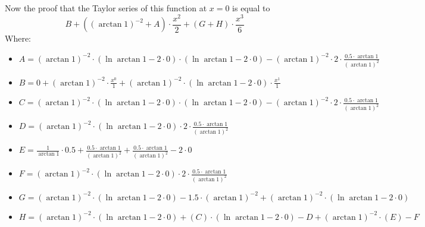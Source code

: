 \documentclass{article}
\begin{document}
Now the proof that the Taylor series of this function at $x = 0$ is equal to
\begin{equation}
B + \left( \left( \arctan 1 \right) ^{-2 } + A \right) \cdot \frac{x ^{2 } }{2 } + \left( G + H \right) \cdot \frac{x ^{3 } }{6 } 
\end{equation}
Where:
\begin{itemize}
	\item $A = \left( \arctan 1 \right) ^{-2 } \cdot \left( \ln \arctan 1 - 2 \cdot 0 \right) \cdot \left( \ln \arctan 1 - 2 \cdot 0 \right) - \left( \arctan 1 \right) ^{-2 } \cdot 2 \cdot \frac{0.5 \cdot \arctan 1 }{\left( \arctan 1 \right) ^{2 } } $
	\item $B = 0 + \left( \arctan 1 \right) ^{-2 } \cdot \frac{x ^{0 } }{1 } + \left( \arctan 1 \right) ^{-2 } \cdot \left( \ln \arctan 1 - 2 \cdot 0 \right) \cdot \frac{x ^{1 } }{1 } $
	\item $C = \left( \arctan 1 \right) ^{-2 } \cdot \left( \ln \arctan 1 - 2 \cdot 0 \right) \cdot \left( \ln \arctan 1 - 2 \cdot 0 \right) - \left( \arctan 1 \right) ^{-2 } \cdot 2 \cdot \frac{0.5 \cdot \arctan 1 }{\left( \arctan 1 \right) ^{2 } } $
	\item $D = \left( \arctan 1 \right) ^{-2 } \cdot \left( \ln \arctan 1 - 2 \cdot 0 \right) \cdot 2 \cdot \frac{0.5 \cdot \arctan 1 }{\left( \arctan 1 \right) ^{2 } } $
	\item $E = \frac{1 }{\arctan 1 } \cdot 0.5 + \frac{0.5 \cdot \arctan 1 }{\left( \arctan 1 \right) ^{2 } } + \frac{0.5 \cdot \arctan 1 }{\left( \arctan 1 \right) ^{2 } } - 2 \cdot 0 $
	\item $F = \left( \arctan 1 \right) ^{-2 } \cdot \left( \ln \arctan 1 - 2 \cdot 0 \right) \cdot 2 \cdot \frac{0.5 \cdot \arctan 1 }{\left( \arctan 1 \right) ^{2 } } $
	\item $G = \left( \arctan 1 \right) ^{-2 } \cdot \left( \ln \arctan 1 - 2 \cdot 0 \right) - 1.5 \cdot \left( \arctan 1 \right) ^{-2 } + \left( \arctan 1 \right) ^{-2 } \cdot \left( \ln \arctan 1 - 2 \cdot 0 \right) $
	\item $H = \left( \arctan 1 \right) ^{-2 } \cdot \left( \ln \arctan 1 - 2 \cdot 0 \right) + \left( C \right) \cdot \left( \ln \arctan 1 - 2 \cdot 0 \right) - D + \left( \arctan 1 \right) ^{-2 } \cdot \left( E \right) - F $
\end{itemize}
\end{document}
